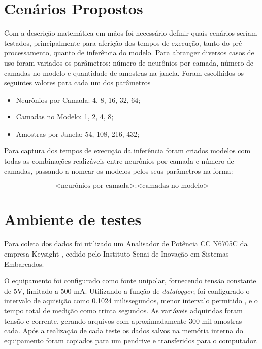 \documentclass[a5paper]{ufsc-thesis}  %
\begin{document}
\section{Cenários Propostos}
Com a descrição matemática em mãos foi necessário definir quais cenários seriam testados, principalmente para aferição dos tempos de execução, tanto do pré-processamento, quanto de inferência do modelo. Para abranger diversos casos de uso foram variados os parâmetros: número de neurônios por camada,  número de camadas no modelo e quantidade de amostras na janela. Foram escolhidos os seguintes valores para cada um dos parâmetros

\begin{itemize}
    \item Neurônios por Camada: 4, 8, 16, 32, 64;
    \item Camadas no Modelo: 1, 2, 4, 8;
    \item Amostras por Janela: 54, 108, 216, 432;
\end{itemize}

Para captura dos tempos de execução da inferência foram criados modelos com todas as combinações realizáveis entre neurônios por camada e número de camadas, passando a nomear os modelos pelos seus parâmetros na forma:

\begin{equation}
    \text{<neurônios por camada>:<camadas no modelo>}
    \label{eqn:model_name}
\end{equation}


\section{Ambiente de testes}
Para coleta dos dados foi utilizado um Analisador de Potência CC N6705C da empresa Keysight \cite{dcanalyzer_datasheet}, cedido pelo Instituto Senai de Inovação em Sistemas Embarcados.

O equipamento foi configurado como fonte unipolar, fornecendo tensão constante de 5V, limitado a 500 mA. Utilizando a função de \textit{datalogger}, foi configurado o intervalo de aquisição como 0.1024 milissegundos, menor intervalo permitido \cite{dcanalyzer_datasheet}, e o tempo total de medição como trinta segundos. As variáveis adquiridas foram tensão e corrente, gerando arquivos com aproximadamente 300 mil amostras cada. Após a realização de cada teste os dados salvos na memória interna do equipamento foram copiados para um pendrive e transferidos para o computador.
\end{document}
